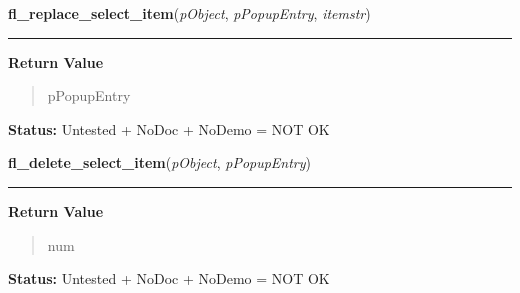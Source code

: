 \hspace{.8\funcindent}\begin{boxedminipage}{\funcwidth}

    \raggedright \textbf{fl\_replace\_select\_item}(\textit{pObject}, \textit{pPopupEntry}, \textit{itemstr})

    \vspace{-1.5ex}

    \rule{\textwidth}{0.5\fboxrule}
\setlength{\parskip}{2ex}
\setlength{\parskip}{1ex}
      \textbf{Return Value}
    \vspace{-1ex}

      \begin{quote}
      pPopupEntry

      \end{quote}

\textbf{Status:} Untested + NoDoc + NoDemo = NOT OK



    \end{boxedminipage}

    \label{xformslib:library:fl_delete_select_item}

    \vspace{0.5ex}

\hspace{.8\funcindent}\begin{boxedminipage}{\funcwidth}

    \raggedright \textbf{fl\_delete\_select\_item}(\textit{pObject}, \textit{pPopupEntry})

    \vspace{-1.5ex}

    \rule{\textwidth}{0.5\fboxrule}
\setlength{\parskip}{2ex}
\setlength{\parskip}{1ex}
      \textbf{Return Value}
    \vspace{-1ex}

      \begin{quote}
      num

      \end{quote}

\textbf{Status:} Untested + NoDoc + NoDemo = NOT OK



    \end{boxedminipage}

    \label{xformslib:library:fl_set_select_items}

